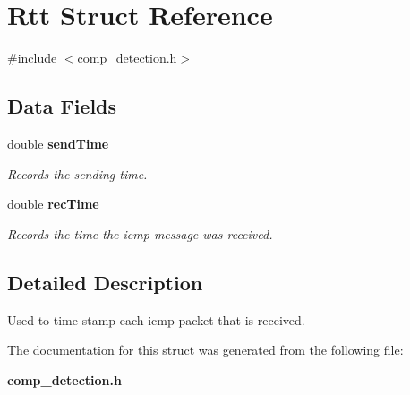 \section{Rtt Struct Reference}
\label{struct_rtt}


{\ttfamily \#include $<$comp\-\_\-detection.\-h$>$}

\subsection*{Data Fields}
\begin{DoxyCompactItemize}
\item 
double {\bf send\-Time}\label{struct_rtt_ad39889e213ea221de1e1d807cf11151a}

\begin{DoxyCompactList}\small\item\em Records the sending time. \end{DoxyCompactList}\item 
double {\bf rec\-Time}\label{struct_rtt_ad6f6e3b6ec4400945f15289aec1f9974}

\begin{DoxyCompactList}\small\item\em Records the time the icmp message was received. \end{DoxyCompactList}\end{DoxyCompactItemize}


\subsection{Detailed Description}
Used to time stamp each icmp packet that is received. 

The documentation for this struct was generated from the following file\-:\begin{DoxyCompactItemize}
\item 
{\bf comp\-\_\-detection.\-h}\end{DoxyCompactItemize}
